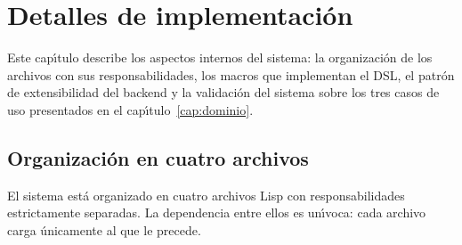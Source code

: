 \chapter{Detalles de implementaci\'on}
\label{cap:implementacion}

Este cap\'{\i}tulo describe los aspectos internos del sistema: la organizaci\'on
de los archivos con sus responsabilidades, los macros que implementan el DSL,
el patr\'on de extensibilidad del backend y la validaci\'on del sistema sobre
los tres casos de uso presentados en el cap\'{\i}tulo~\ref{cap:dominio}.

\section{Organizaci\'on en cuatro archivos}
\label{sec:organizacion}

El sistema est\'a organizado en cuatro archivos Lisp con responsabilidades
estrictamente separadas.  La dependencia entre ellos es un\'{\i}voca:
cada archivo carga \'unicamente al que le precede.

